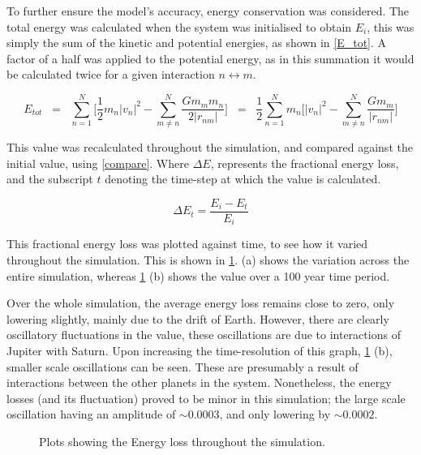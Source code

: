 \documentclass[a4paper,10pt]{article}
\begin{document}
To further ensure the model's accuracy, energy conservation was considered. The total energy was calculated when the system was initialised to obtain $E_i$, this was simply the sum of the kinetic and potential energies, as shown in \cref{E_tot}. A factor of a half was applied to the potential energy, as in this summation it would be calculated twice for a given interaction $n \leftrightarrow m$. 

\begin{equation} \label{E_tot}
    E_{tot}  \;\; =  \;\;  \sum\limits_{n=1}^{N} \bigg[ \frac{1}{2}m_n\left|v_n\right|^2 - \sum\limits_{m\neq n}^{N}\frac{G m_m m_n}{2 \left|r_{nm}\right|}\bigg]  \;\; = \;\; \frac{1}{2} \sum\limits_{n=1}^{N}m_n \bigg[\left|v_n\right|^2 - \sum\limits_{m\neq n}^{N}\frac{G m_m}{\left|r_{nm}\right|}\bigg] 
 \end{equation}
 
 This value was recalculated throughout the simulation, and compared against the initial value, using \cref{compare}. Where $ \Delta E$, represents the fractional energy loss, and the subscript $t$ denoting the time-step at which the value is calculated.
 
 \begin{equation} \label{compare}
    \Delta E_t =  \frac{E_i - E_t}{E_i}
\end{equation}

This fractional energy loss was plotted against time, to see how it varied throughout the simulation. This is shown in \cref{Energy}.  (a) shows the variation across the entire simulation, whereas \cref{Energy} (b) shows the value over a 100 year time period. 

Over the whole simulation, the average energy loss remains close to zero, only lowering slightly, mainly due to the drift of Earth. However, there are clearly oscillatory fluctuations in the value, these oscillations are due to interactions of Jupiter with Saturn. Upon increasing the time-resolution of this graph, \cref{Energy} (b), smaller scale oscillations can be seen. These are presumably a result of interactions between the other planets in the system. Nonetheless, the energy losses (and its fluctuation) proved to be minor in this simulation; the large scale oscillation having an amplitude of $\sim 0.0003$, and only lowering by $\sim 0.0002$.

\begin{figure}[h!]
    \centering
    \qquad
    \caption{Plots showing the Energy loss throughout the simulation.}%
    \label{Energy}%
\end{figure}
\end{document}
